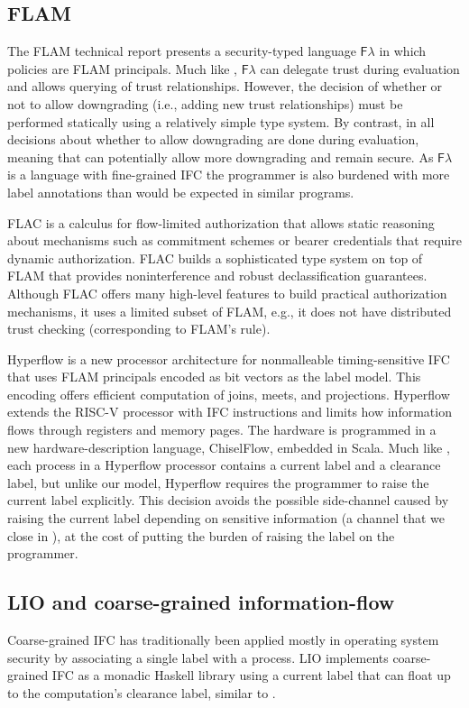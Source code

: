 \subsection{FLAM}
The FLAM technical report \cite{flamtr} presents a security-typed language $\mathsf{F}\lambda$ in which policies are FLAM principals. Much like \lang{}, $\mathsf{F}\lambda$ can delegate trust during evaluation and allows querying of trust relationships. However, the decision of whether or not to allow downgrading (i.e., adding new trust relationships) must be performed statically using a relatively simple type system. By contrast, in \lang{} all decisions about whether to allow downgrading are done during evaluation, meaning that \lang{} can potentially allow more downgrading and remain secure. As $\mathsf{F}\lambda$ is a language with fine-grained IFC the programmer is also burdened with more label annotations than would be expected in  similar \lang{} programs.

FLAC \cite{7536372} is a calculus for flow-limited authorization that allows static reasoning about mechanisms such as commitment schemes or bearer credentials that require dynamic authorization. FLAC builds a sophisticated type system on top of FLAM that provides noninterference and robust declassification guarantees. Although FLAC offers many high-level features to build practical authorization mechanisms, it uses a limited subset of FLAM, e.g., it does not have distributed trust checking (corresponding to FLAM's  rule).

Hyperflow \cite{hyperflow} is a new processor architecture for nonmalleable timing-sensitive IFC that uses FLAM principals encoded as bit vectors as the label model. This encoding offers efficient computation of joins, meets, and projections. Hyperflow extends the RISC-V processor with IFC instructions and limits how information flows through registers and memory pages. The hardware is programmed in a new hardware-description language, ChiselFlow, embedded in Scala. Much like \lang{}, each process in a Hyperflow processor contains a current label and a clearance label, but unlike our model, Hyperflow requires the programmer to raise the current label explicitly. This decision avoids the possible side-channel caused by raising the current label depending on sensitive information (a channel that we close in \lang), at the cost of putting the burden of raising the label on the programmer.

\subsection{LIO and coarse-grained information-flow}
Coarse-grained IFC has traditionally been applied mostly in operating system security \cite{Zeldovich:2006:MIF:1267308.1267327, Krohn:2007:IFC:1294261.1294293} by associating a single label with a process. LIO \cite{SRMMlio} implements coarse-grained IFC as a monadic Haskell library using a current label that can float up to the computation's clearance label, similar to \lang.


